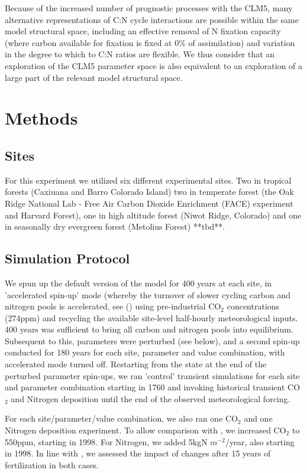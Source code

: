 \documentclass[draft,linenumbers]{agujournal}
\begin{document}
Because of the increased number of prognostic processes with the CLM5, many alternative representations of C:N cycle interactions are possible within the same model structural space, including an effective removal of N fixation capacity (where carbon available for fixation is fixed at 0$\%$ of assimilation) and variation in the degree to which to C:N ratios are flexible. We thus consider that an exploration of the CLM5 parameter space is also equivalent to an exploration of a large part of the relevant model structural space.

\section{Methods}

\subsection{Sites}

For this experiment we utilized six different experimental sites. Two in tropical forests (Caxiuana and Barro Colorado Island) two in temperate forest (the Oak Ridge National Lab - Free Air Carbon Dioxide Enrichment (FACE) experiment and Harvard Forest), one in high altitude forest (Niwot Ridge, Colorado) and one in seasonally dry evergreen forest (Metolius Forest) **tbd**.

\subsection{Simulation Protocol}
We spun up the default version of the model for 400 years at each site, in 'accelerated spin-up' mode (whereby the turnover of slower cycling carbon and nitrogen pools is accelerated, see (\cite{lawrence2018}) using pre-industrial CO$_{2}$ concentrations (274ppm) and recycling the available site-level half-hourly meteorological inputs. 400 years was sufficient to bring all carbon and nitrogen pools into equilibrium. Subsequent to this, parameters were perturbed (see below), and a second spin-up conducted for 180 years for each site, parameter and value combination, with accelerated mode turned off. Restarting from the state at the end of the perturbed parameter spin-ups, we ran 'control' transient simulations for each site and parameter combination starting in 1760 and invoking historical transient CO$_{2}$ and Nitrogen deposition until the end of the observed meteorological forcing.

For each site/parameter/value combination, we also ran one CO$_{2}$ and one Nitrogen deposition experiment. To allow comparison with \cite{wieder}, we increased CO$_{2}$ to 550ppm, starting in 1998. For Nitrogen, we added 5kgN $m^{-2}$/year, also starting in 1998. In line with \cite{wieder}, we assessed the impact of changes after 15 years of fertilization in both cases.
\end{document}
